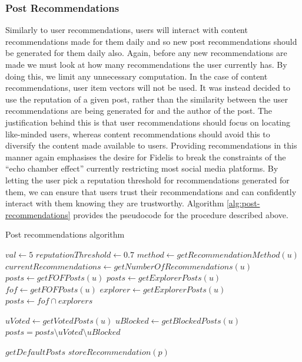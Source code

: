 \subsubsection{Post Recommendations}
\label{sec:post-recommendations}
Similarly to user recommendations, users will interact with content recommendations made for them daily and so new post recommendations should be generated for them daily also. Again, before any new recommendations are made we must look at how many recommendations the user currently has. By doing this, we limit any unnecessary computation. In the case of content recommendations, user item vectors will not be used. It was instead decided to use the reputation of a given post, rather than the similarity between the user recommendations are being generated for and the author of the post. The justification behind this is that user recommendations should focus on locating like-minded users, whereas content recommendations should avoid this to diversify the content made available to users. Providing recommendations in this manner again emphasises the desire for Fidelis to break the constraints of the ``echo chamber effect'' currently restricting most social media platforms. By letting the user pick a reputation threshold for recommendations generated for them, we can ensure that users trust their recommendations and can confidently interact with them knowing they are trustworthy. Algorithm \ref{alg:post-recommendations} provides the pseudocode for the procedure described above. 

\begin{algorithm}
\caption{Post recommendations algorithm}
\label{alg:post-recommendations}
\begin{algorithmic}[1]
\State $val\gets 5$
\State $reputationThreshold\gets 0.7$
	\State $method\gets getRecommendationMethod(u)$
	\State $currentRecommendations\gets getNumberOfRecommendations(u)$
			\State $posts\gets getFOFPosts(u)$
		\EndIf
			\State $posts\gets getExplorerPosts(u)$
		\EndIf
			\State $fof\gets getFOFPosts(u)$
			\State $explorer\gets getExplorerPosts(u)$
			\State $posts\gets fof \cap explorers$
		\EndIf
		
		\State $uVoted\gets getVotedPosts(u)$
		\State $uBlocked\gets getBlockedPosts(u)$
		\State $posts = posts \setminus uVoted \setminus uBlocked$
		
			\State $getDefaultPosts$
		\Else
					\State $storeRecommendation(p)$
				\EndIf
			\EndFor
		\EndIf
	\EndIf
\EndFor
\end{algorithmic}
\end{algorithm}

